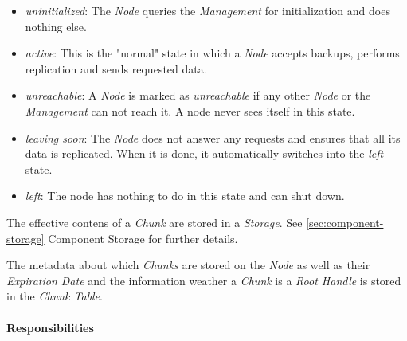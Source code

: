 \begin{itemize}
	\item \emph{uninitialized}: The \emph{Node} queries the \emph{Management} for initialization and does nothing else.
	\item \emph{active}: This is the "normal" state in which a \emph{Node} accepts backups, performs replication and sends requested data.
	\item \emph{unreachable}: A \emph{Node} is marked as \emph{unreachable} if any other \emph{Node} or the \emph{Management} can not reach it. A node never sees itself in this state.
	\item  \emph{leaving soon}: The \emph{Node} does not answer any requests and ensures that all its data is replicated. When it is done, it automatically switches into the \emph{left} state.
	\item \emph{left}: The node has nothing to do in this state and can shut down.
\end{itemize}

The effective contens of a \emph{Chunk} are stored in a \emph{Storage}. See \ref{sec:component-storage} Component Storage for further details.

The metadata about which \emph{Chunks} are stored on the \emph{Node} as well as their \emph{Expiration Date} and the information weather a \emph{Chunk} is a \emph{Root Handle} is stored in the \emph{Chunk Table}.

\paragraph{Responsibilities}

